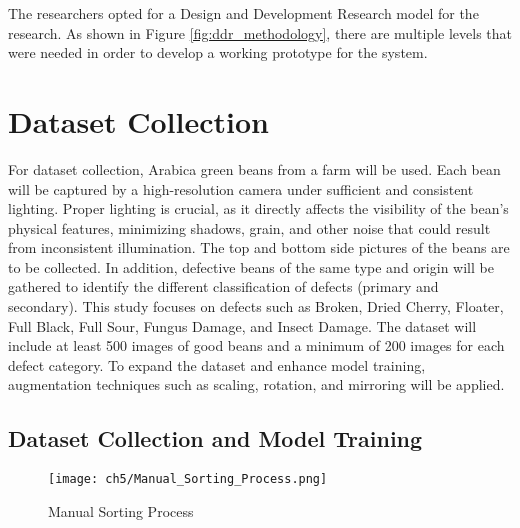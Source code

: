 The researchers opted for a Design and Development Research model for the research. As shown in Figure \ref{fig:ddr_methodology},  there are multiple levels that were needed in order to develop a working prototype for the system. 



\section{Dataset Collection}
\label{sec:dataset_collection}
For dataset collection, Arabica green beans from a farm will be used. Each bean will be captured by a high-resolution camera under sufficient and consistent lighting. Proper lighting is crucial, as it directly affects the visibility of the bean’s physical features, minimizing shadows, grain, and other noise that could result from inconsistent illumination. The top and bottom side pictures of the beans are to be collected. In addition, defective beans of the same type and origin will be gathered to identify the different classification of defects (primary and secondary). This study focuses on defects such as Broken, Dried Cherry, Floater, Full Black, Full Sour, Fungus Damage, and Insect Damage. The dataset will include at least 500 images of good beans and a minimum of 200 images for each defect category. To expand the dataset and enhance model training, augmentation techniques such as scaling, rotation, and mirroring will be applied. 

\subsection{Dataset Collection and Model Training}

\begin{figure}[H]
    \centering
    \texttt{[image: ch5/Manual\_Sorting\_Process.png]}
    \caption{Manual Sorting Process}
    \label{fig:manual_sorting}
\end{figure}

